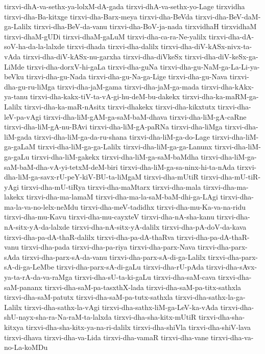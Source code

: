 {tirxvi-dhA-va-sethx-ya-lolxM-dA-gada
tirxvi-dhA-va-sethx-yo-Lage
tirxvidha
tirxvi-dha-Ba-kitxge
tirxvi-dha-Barx-meya
tirxvi-dha-BeVda
tirxvi-dha-BeV-daM-ga-Lalilx
tirxvi-dha-BeV-da-vanu
tirxvi-dha-BoV-ja-nada
tirxvidhaH
tirxvidhaM
tirxvi-dhaM-gUDi
tirxvi-dhaM-gaLuM
tirxvi-dha-ca-ra-Ne-yalilx
tirxvi-dha-dA-soV-ha-da-la-lalxde
tirxvi-dhada
tirxvi-dha-dalilx
tirxvi-dha-diV-kASx-nivx-ta-vAda
tirxvi-dha-diV-kASx-nu-garxha
tirxvi-dha-diVkeSx
tirxvi-dha-diV-keSx-ga-LiMde
tirxvi-dha-dorxV-hi-gaLa
tirxvi-dha-guNa
tirxvi-dha-gu-NaM-ga-La-Li-ya-beVku
tirxvi-dha-gu-Nada
tirxvi-dha-gu-Na-ga-Lige
tirxvi-dha-gu-Nava
tirxvi-dha-gu-ru-liMga
tirxvi-dha-jaM-gama
tirxvi-dha-jaM-ga-mada
tirxvi-dha-kAkx-ya-tanu
tirxvi-dha-kakx-tiV-ta-vA-gi-hu-deM-bu-dakekx
tirxvi-dha-ka-maRM-ga-Lalilx
tirxvi-dha-ka-maR-nAsitx
tirxvi-dhakekx
tirxvi-dha-kikxtutx
tirxvi-dha-leV-pa-vAgi
tirxvi-dha-liM-gAM-ga-saM-baM-dhava
tirxvi-dha-liM-gA-caRne
tirxvi-dha-liM-gA-nu-BAvi
tirxvi-dha-liM-gA-paRNa
tirxvi-dha-liMga
tirxvi-dha-liM-gada
tirxvi-dha-liM-ga-da-ru-shana
tirxvi-dha-liM-ga-do-Lage
tirxvi-dha-liM-ga-gaLaM
tirxvi-dha-liM-ga-ga-Lalilx
tirxvi-dha-liM-ga-ga-Lanunx
tirxvi-dha-liM-ga-gaLu
tirxvi-dha-liM-gakekx
tirxvi-dha-liM-ga-saM-baMdha
tirxvi-dha-liM-ga-saM-baM-dha-vA-yi-tetxM-deM-biri
tirxvi-dha-liM-ga-sa-ninx-hi-ta-nAda
tirxvi-dha-liM-ga-savx-rU-peY-kiV-BU-ta-liMgaM
tirxvi-dha-mUtiR
tirxvi-dha-mU-tiR-yAgi
tirxvi-dha-mU-tiRya
tirxvi-dha-maMtarx
tirxvi-dha-mala
tirxvi-dha-ma-lakekx
tirxvi-dha-ma-lamaM
tirxvi-dha-ma-la-saM-baM-dhi-ga-LAgi
tirxvi-dha-ma-la-va-no-lelx-neMdu
tirxvi-dha-meV-tadidhx
tirxvi-dha-mu-Ka-va-na-ridu
tirxvi-dha-mu-Kavu
tirxvi-dha-mu-cayxteV
tirxvi-dha-nA-sha-kanu
tirxvi-dha-nA-sitx-yA-da-lalxde
tirxvi-dha-nA-sitx-yA-dalilx
tirxvi-dha-pA-doV-da-kava
tirxvi-dha-pa-dA-thaR-dalilx
tirxvi-dha-pa-dA-thaRva
tirxvi-dha-pa-dA-thaR-vanu
tirxvi-dha-pada
tirxvi-dha-pa-riya
tirxvi-dha-parx-Nava
tirxvi-dha-parx-sAda
tirxvi-dha-parx-sA-da-vanu
tirxvi-dha-parx-sA-di-ga-Lalilx
tirxvi-dha-parx-sA-di-ga-LeMbe
tirxvi-dha-parx-sA-di-gaLu
tirxvi-dha-rU-pAda
tirxvi-dha-sAvx-ya-ta-rA-da-va-raMga
tirxvi-dha-sU-ta-ki-gaLu
tirxvi-dha-saM-cava
tirxvi-dha-saM-pananx
tirxvi-dha-saM-pa-tasxthX-lada
tirxvi-dha-saM-pa-titx-sathxla
tirxvi-dha-saM-patutx
tirxvi-dha-saM-pa-tutx-sathxla
tirxvi-dha-sathx-la-ga-Lalilx
tirxvi-dha-sathx-la-vAgi
tirxvi-dha-sathx-liM-ga-LeV-ka-vAda
tirxvi-dha-shU-nayx-sha-ra-Na-raM-ta-lalxda
tirxvi-dha-sha-kitx-mUtiR
tirxvi-dha-sha-kitxya
tirxvi-dha-sha-kitx-ya-na-ri-dalilx
tirxvi-dha-shiVla
tirxvi-dha-shiV-lava
tirxvi-dhava
tirxvi-dha-va-Lida
tirxvi-dha-vamaR
tirxvi-dha-vane
tirxvi-dha-va-no-La-koMDu
}
